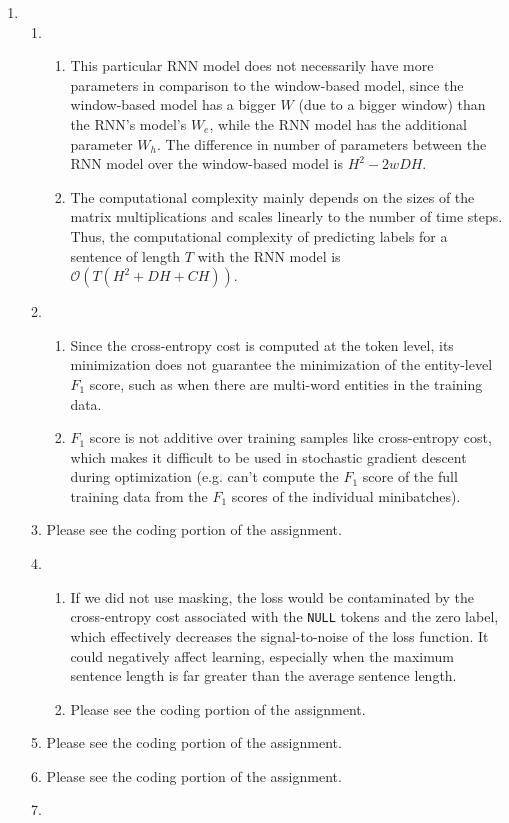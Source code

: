\documentclass[10pt,reqno]{amsart}
\begin{document}
\begin{enumerate}[topsep=0pt,itemsep=3ex,partopsep=1ex,parsep=1ex]
\item
  \begin{enumerate}[itemsep=2ex]
  \item 
    \begin{enumerate}[itemsep=2ex]
      \item This particular RNN model does not necessarily have more parameters in 
        comparison to the window-based model, since the window-based model has a 
        bigger $W$ (due to a bigger window) than the RNN's model's $W_e$, while the RNN model 
        has the additional parameter $W_h$.
        The difference in number of parameters between the RNN model over 
        the window-based model is $H^2 - 2wDH$.
      \item The computational complexity mainly depends on the sizes of the 
        matrix multiplications and scales linearly to the number of time steps.
        Thus, the computational complexity of predicting labels for a sentence of length $T$
        with the RNN model is $\mathcal{O}(T(H^2+DH+CH))$.
    \end{enumerate}
  \item 
    \begin{enumerate}[itemsep=2ex]
      \item Since the cross-entropy cost is computed at the token level, its minimization
        does not guarantee the minimization of the entity-level $F_1$ score, such as when there 
        are multi-word entities in the training data. 
      \item $F_1$ score is not additive over training samples like cross-entropy cost, which makes 
        it difficult to be used in stochastic gradient descent during optimization (e.g. can't 
        compute the $F_1$ score of the full training data from the $F_1$ scores of the individual minibatches).
    \end{enumerate}
  \item Please see the coding portion of the assignment.
  \item 
    \begin{enumerate}[itemsep=2ex]
      \item If we did not use masking, the loss would be contaminated by the cross-entropy cost 
        associated with the \texttt{NULL} tokens and the zero label, which effectively decreases the signal-to-noise 
        of the loss function. It could negatively affect learning, especially  when the maximum sentence length is far greater than 
        the average sentence length. 
      \item Please see the coding portion of the assignment.
    \end{enumerate}
  \item Please see the coding portion of the assignment.
  \item Please see the coding portion of the assignment.
  \item 
  \end{enumerate}



\end{enumerate}
\end{document}
